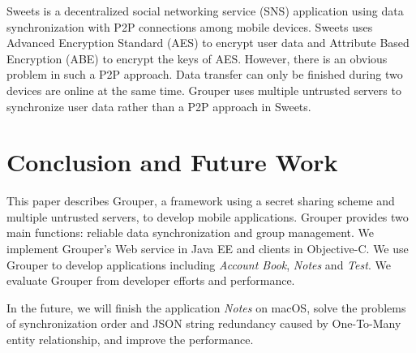 \documentclass[twocolumn,10pt]{article}
\begin{document}
Sweets\cite{sweets} is a decentralized social networking service (SNS) application using data synchronization with P2P connections among mobile devices. 
Sweets uses Advanced Encryption Standard (AES) to encrypt user data and Attribute Based Encryption (ABE) to encrypt the keys of AES. 
However, there is an obvious problem in such a P2P approach. 
Data transfer can only be finished during two devices are online at the same time. 
Grouper uses multiple untrusted servers to synchronize user data rather than a P2P approach in Sweets.

\section{Conclusion and Future Work}

This paper describes Grouper, a framework using a secret sharing scheme and multiple untrusted servers, to develop mobile applications.
Grouper provides two main functions: reliable data synchronization and group management. 
We implement Grouper's Web service in Java EE and clients in Objective-C. 
We use Grouper to develop applications including \emph{Account Book}, \emph{Notes} and \emph{Test}. 
We evaluate Grouper from developer efforts and performance. 

In the future, we will finish the application \emph{Notes} on macOS, solve the problems of synchronization order and JSON string redundancy caused by One-To-Many entity relationship, and improve the performance.


{
	\footnotesize
	
}
\end{document}
